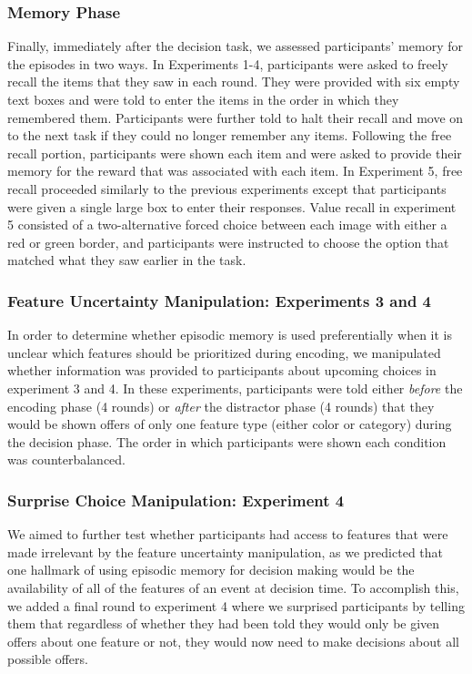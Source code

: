 \documentclass[10pt,letterpaper]{article}
\begin{document}
\subsubsection{Memory Phase}

Finally, immediately after the decision task, we assessed participants' memory for the episodes in two ways. In Experiments 1-4, participants were asked to freely recall the items that they saw in each round. They were provided with six empty text boxes and were told to enter the items in the order in which they remembered them. Participants were further told to halt their recall and move on to the next task if they could no longer remember any items. Following the free recall portion, participants were shown each item and were asked to provide their memory for the reward that was associated with each item. In Experiment 5, free recall proceeded similarly to the previous experiments except that participants were given a single large box to enter their responses. Value recall in experiment 5 consisted of a two-alternative forced choice between each image with either a red or green border, and participants were instructed to choose the option that matched what they saw earlier in the task.

\subsubsection{Feature Uncertainty Manipulation: Experiments 3 and 4}

In order to determine whether episodic memory is used preferentially when it is unclear which features should be prioritized during encoding, we manipulated whether information was provided to participants about upcoming choices in experiment 3 and 4. In these experiments, participants were told either \textit{before} the encoding phase (4 rounds) or \textit{after} the distractor phase (4 rounds) that they would be shown offers of only one feature type (either color or category) during the decision phase. The order in which participants were shown each condition was counterbalanced.

\subsubsection{Surprise Choice Manipulation: Experiment 4}

We aimed to further test whether participants had access to features that were made irrelevant by the feature uncertainty manipulation, as we predicted that one hallmark of using episodic memory for decision making would be the availability of all of the features of an event at decision time. To accomplish this, we added a final round to experiment 4 where we surprised participants by telling them that regardless of whether they had been told they would only be given offers about one feature or not, they would now need to make decisions about all possible offers.
\end{document}
